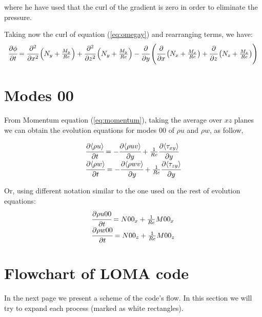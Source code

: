 \documentclass[titlepage,11pt]{article}
\newcommand\ppt[1]{\cfrac{\partial#1}{\partial t}} %
\newcommand\ppx[1]{\cfrac{\partial#1}{\partial x}} %
\newcommand\ppy[1]{\cfrac{\partial#1}{\partial y}} %
\newcommand\ppz[1]{\cfrac{\partial#1}{\partial z}} %
\newcommand\pppx[1]{\cfrac{\partial^2#1}{\partial x^2}} %
\newcommand\pppz[1]{\cfrac{\partial^2#1}{\partial z^2}} %
\begin{document}
where he have used that the curl of the gradient is zero in order to eliminate the pressure.

Taking now the curl of equation (\ref{eq:omegay}) and rearranging terms, we have:
\begin{equation}
	\begin{array}{lcl}
		\ppt{\phi}=\pppx{}\left( N_y+\frac{M_y}{Re}\right)+\pppz{} \left( N_y+\frac{M_y}{Re} \right)- 
		\ppy{} \left( \ppx{} \left( N_x+\frac{M_x}{Re} \right)+\ppz{} \left( N_z+\frac{M_z}{Re} \right) \right)
	\end{array}
	\label{eq:phi}
\end{equation}


\section{Modes 00}
\label{sec:modes00}

From Momentum equation (\ref{eq:momentum}), taking the average over $xz$ planes we can obtain the evolution equations for modes 00 of $\rho u$ and $\rho w$, as follow,


\begin{equation}
	\begin{array}{lcl}
		\ppt{\langle \rho u \rangle}=-\ppy{ \langle \rho u v \rangle}+\frac{1}{Re} \ppy{ \langle \tau_{xy} \rangle} \\
		\ppt{\langle \rho w \rangle}=-\ppy{\langle \rho w v \rangle}+\frac{1}{Re} \ppy{\langle \tau_{zy} \rangle} 
	\end{array}
         \label{eq:modes00}
\end{equation}

Or, using different notation similar to the one used on the rest of evolution equations:
\begin{equation}
	\begin{array}{lcl}
		\ppt{\rho u 00}=N00_x+\frac{1}{Re} M00_x \\
		\ppt{\rho w 00}=N00_z+\frac{1}{Re} M00_z  
	\end{array}
         \label{eq:modes002}
\end{equation}




\section{Flowchart of LOMA code}

In the next page we present a scheme of the code's flow. In this section we will try to expand each process (marked as white rectangles).
\end{document}

